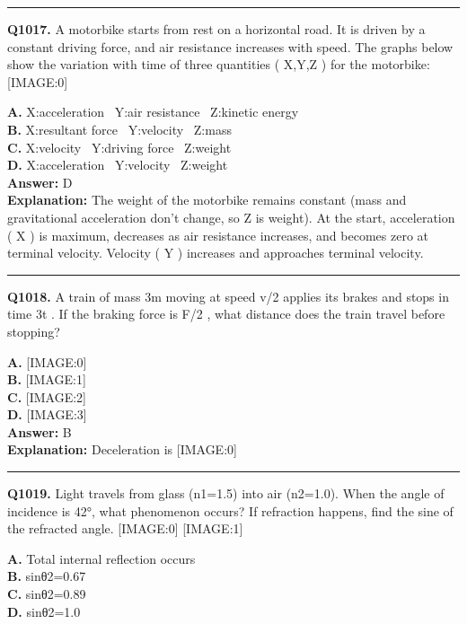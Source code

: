 \documentclass[12pt]{article}
\begin{document}
\hrule
\vspace{1em}


\noindent
\textbf{Q1017.} A motorbike starts from rest on a horizontal road. It is driven by a constant driving force, and air resistance increases with speed. The graphs below show the variation with time of three quantities (
X,Y,Z
) for the motorbike:
[IMAGE:0]



\textbf{A.} X:acceleration  Y:air resistance  Z:kinetic energy \\
\textbf{B.} X:resultant force  Y:velocity  Z:mass \\
\textbf{C.} X:velocity  Y:driving force  Z:weight \\
\textbf{D.} X:acceleration  Y:velocity  Z:weight \\

\textbf{Answer:} D \\
\textbf{Explanation:} The weight of the motorbike remains constant (mass and gravitational acceleration don’t change, so
Z
is weight). At the start, acceleration (
X
) is maximum, decreases as air resistance increases, and becomes zero at terminal velocity. Velocity (
Y
) increases and approaches terminal velocity.

\hrule
\vspace{1em}


\noindent
\textbf{Q1018.} A train of mass
3m
moving at speed
v/2
applies its brakes and stops in time
3t
. If the braking force is
F/2
, what distance does the train travel before stopping?



\textbf{A.} [IMAGE:0] \\
\textbf{B.} [IMAGE:1] \\
\textbf{C.} [IMAGE:2] \\
\textbf{D.} [IMAGE:3] \\

\textbf{Answer:} B \\
\textbf{Explanation:} Deceleration is
[IMAGE:0]

\hrule
\vspace{1em}


\noindent
\textbf{Q1019.} Light travels from glass (n1=1.5) into air (n2=1.0). When the angle of incidence is 42°, what phenomenon occurs? If refraction happens, find the sine of the refracted angle.
[IMAGE:0]
[IMAGE:1]



\textbf{A.} Total internal reflection occurs \\
\textbf{B.} sinθ2=0.67 \\
\textbf{C.} sinθ2=0.89 \\
\textbf{D.} sinθ2=1.0 \\
\end{document}
